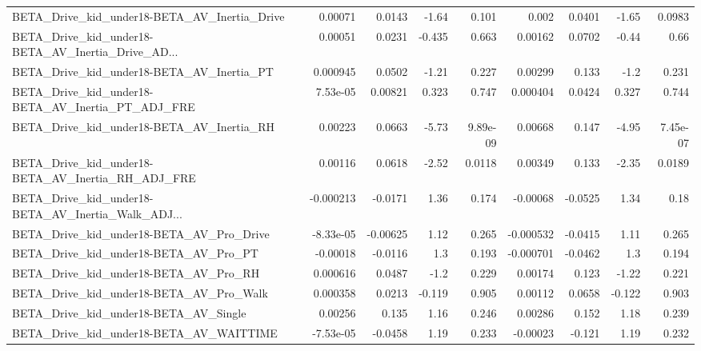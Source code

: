 \begin{tabular}{lrrrrrrrr}
BETA\_Drive\_kid\_under18-BETA\_AV\_Inertia\_Drive       &     0.00071 &       0.0143 &    -1.64 &    0.101 &      0.002 &      0.0401 &        -1.65 &        0.0983 \\
BETA\_Drive\_kid\_under18-BETA\_AV\_Inertia\_Drive\_AD... &     0.00051 &       0.0231 &   -0.435 &    0.663 &    0.00162 &      0.0702 &        -0.44 &          0.66 \\
BETA\_Drive\_kid\_under18-BETA\_AV\_Inertia\_PT          &    0.000945 &       0.0502 &    -1.21 &    0.227 &    0.00299 &       0.133 &         -1.2 &         0.231 \\
BETA\_Drive\_kid\_under18-BETA\_AV\_Inertia\_PT\_ADJ\_FRE  &    7.53e-05 &      0.00821 &    0.323 &    0.747 &   0.000404 &      0.0424 &        0.327 &         0.744 \\
BETA\_Drive\_kid\_under18-BETA\_AV\_Inertia\_RH          &     0.00223 &       0.0663 &    -5.73 & 9.89e-09 &    0.00668 &       0.147 &        -4.95 &      7.45e-07 \\
BETA\_Drive\_kid\_under18-BETA\_AV\_Inertia\_RH\_ADJ\_FRE  &     0.00116 &       0.0618 &    -2.52 &   0.0118 &    0.00349 &       0.133 &        -2.35 &        0.0189 \\
BETA\_Drive\_kid\_under18-BETA\_AV\_Inertia\_Walk\_ADJ... &   -0.000213 &      -0.0171 &     1.36 &    0.174 &   -0.00068 &     -0.0525 &         1.34 &          0.18 \\
BETA\_Drive\_kid\_under18-BETA\_AV\_Pro\_Drive           &   -8.33e-05 &     -0.00625 &     1.12 &    0.265 &  -0.000532 &     -0.0415 &         1.11 &         0.265 \\
BETA\_Drive\_kid\_under18-BETA\_AV\_Pro\_PT              &    -0.00018 &      -0.0116 &      1.3 &    0.193 &  -0.000701 &     -0.0462 &          1.3 &         0.194 \\
BETA\_Drive\_kid\_under18-BETA\_AV\_Pro\_RH              &    0.000616 &       0.0487 &     -1.2 &    0.229 &    0.00174 &       0.123 &        -1.22 &         0.221 \\
BETA\_Drive\_kid\_under18-BETA\_AV\_Pro\_Walk            &    0.000358 &       0.0213 &   -0.119 &    0.905 &    0.00112 &      0.0658 &       -0.122 &         0.903 \\
BETA\_Drive\_kid\_under18-BETA\_AV\_Single              &     0.00256 &        0.135 &     1.16 &    0.246 &    0.00286 &       0.152 &         1.18 &         0.239 \\
BETA\_Drive\_kid\_under18-BETA\_AV\_WAITTIME            &   -7.53e-05 &      -0.0458 &     1.19 &    0.233 &   -0.00023 &      -0.121 &         1.19 &         0.232 \\

\end{tabular}
